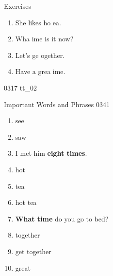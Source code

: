 \documentclass[aspectratio=169,xcolor={dvipsnames,table}]{beamer}
\begin{document}
\begin{frame}[plain]{Exercises }
  \Large
  \begin{enumerate}
    \item<2-> She likes ho  \alt<1-2>{t}{\textbf{t}}ea.
    \item<4-> Wha  ime\only<5->{{\textbottomtiebar\ }} is it now?
    \item<6-> Let's ge  ogether.
    \item<8-> Have a grea  ime.
  \end{enumerate}
  \hfill{\tiny 0317}\,{\scriptsize {}\,tt\_02}

\end{frame}
\begin{frame}[plain,t]{Important Words and Phrases}
  \Large
  \hfill{\tiny 0341}\,{\scriptsize {}}
  \vspace{-15pt}
  \pause
  \begin{enumerate}[<+- |alert@+>]\setlength{\itemsep}{-1pt}
    \item see
    \item saw
    \item I met him \textbf{eight times}.
    \item hot
    \item tea
    \item hot tea
    \item \textbf{What time} do you go to bed?
    \item together
    \item get together
    \item great
  \end{enumerate}

\end{frame}
\end{document}
